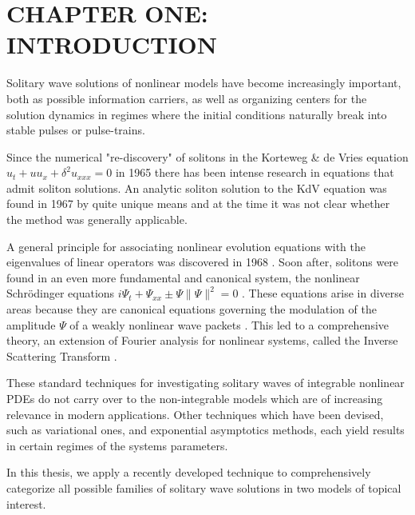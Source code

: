 \chapter{CHAPTER ONE: INTRODUCTION} \label{chapter_1}

Solitary wave solutions of nonlinear models have become increasingly
important, both as possible information carriers,
as well as organizing centers for the solution dynamics in regimes
where the initial conditions naturally break into stable pulses or
pulse-trains.

Since the numerical "re-discovery" of solitons in the Korteweg \& de Vries
equation $ u_t + u u_x + \delta^2 u_{xxx} = 0$ \cite{ZK} in 1965 there has been
intense research in equations that admit soliton solutions.  An analytic soliton
solution to the KdV equation was found in 1967 \cite{GGKM} by quite unique means
and at the time it was not clear whether the method was generally applicable.

A general principle for associating nonlinear evolution equations with the
eigenvalues of linear operators was discovered in 1968 \cite{Lax}.  Soon after,
solitons were found in an even more fundamental and canonical system, the
nonlinear Schr\"odinger equations $ i \Psi_t + \Psi_{xx} \pm \Psi\|\Psi\|^2 = 0
$ \cite{ZS}. These equations arise in diverse areas because they are canonical
equations governing the modulation of the amplitude $\Psi$ of a weakly nonlinear
wave packets \cite{DJ}.  This led to a comprehensive theory, an extension of
Fourier analysis for nonlinear systems, called the Inverse Scattering Transform
\cite{AKNS}.

These standard techniques for investigating solitary waves of
integrable nonlinear PDEs do not carry over to the
non-integrable models which are of increasing relevance in modern
applications. Other techniques which have been devised, such as
variational ones, and exponential asymptotics methods, each yield
results in certain regimes of the systems parameters.

In this thesis, we apply a recently developed technique to
comprehensively categorize all possible families of solitary wave
solutions in two models of topical interest.


